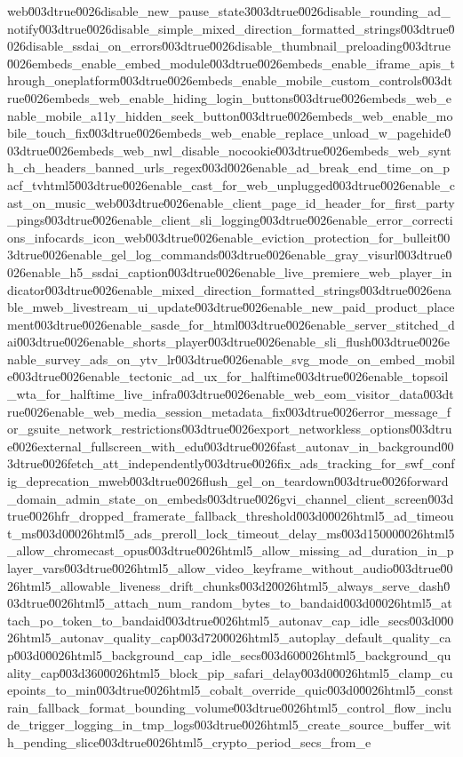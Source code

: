 {web\u003dtrue\u0026disable_new_pause_state3\u003dtrue\u0026disable_rounding_ad_notify\u003dtrue\u0026disable_simple_mixed_direction_formatted_strings\u003dtrue\u0026disable_ssdai_on_errors\u003dtrue\u0026disable_thumbnail_preloading\u003dtrue\u0026embeds_enable_embed_module\u003dtrue\u0026embeds_enable_iframe_apis_through_oneplatform\u003dtrue\u0026embeds_enable_mobile_custom_controls\u003dtrue\u0026embeds_web_enable_hiding_login_buttons\u003dtrue\u0026embeds_web_enable_mobile_a11y_hidden_seek_button\u003dtrue\u0026embeds_web_enable_mobile_touch_fix\u003dtrue\u0026embeds_web_enable_replace_unload_w_pagehide\u003dtrue\u0026embeds_web_nwl_disable_nocookie\u003dtrue\u0026embeds_web_synth_ch_headers_banned_urls_regex\u003d\u0026enable_ad_break_end_time_on_pacf_tvhtml5\u003dtrue\u0026enable_cast_for_web_unplugged\u003dtrue\u0026enable_cast_on_music_web\u003dtrue\u0026enable_client_page_id_header_for_first_party_pings\u003dtrue\u0026enable_client_sli_logging\u003dtrue\u0026enable_error_corrections_infocards_icon_web\u003dtrue\u0026enable_eviction_protection_for_bulleit\u003dtrue\u0026enable_gel_log_commands\u003dtrue\u0026enable_gray_visurl\u003dtrue\u0026enable_h5_ssdai_caption\u003dtrue\u0026enable_live_premiere_web_player_indicator\u003dtrue\u0026enable_mixed_direction_formatted_strings\u003dtrue\u0026enable_mweb_livestream_ui_update\u003dtrue\u0026enable_new_paid_product_placement\u003dtrue\u0026enable_sasde_for_html\u003dtrue\u0026enable_server_stitched_dai\u003dtrue\u0026enable_shorts_player\u003dtrue\u0026enable_sli_flush\u003dtrue\u0026enable_survey_ads_on_ytv_lr\u003dtrue\u0026enable_svg_mode_on_embed_mobile\u003dtrue\u0026enable_tectonic_ad_ux_for_halftime\u003dtrue\u0026enable_topsoil_wta_for_halftime_live_infra\u003dtrue\u0026enable_web_eom_visitor_data\u003dtrue\u0026enable_web_media_session_metadata_fix\u003dtrue\u0026error_message_for_gsuite_network_restrictions\u003dtrue\u0026export_networkless_options\u003dtrue\u0026external_fullscreen_with_edu\u003dtrue\u0026fast_autonav_in_background\u003dtrue\u0026fetch_att_independently\u003dtrue\u0026fix_ads_tracking_for_swf_config_deprecation_mweb\u003dtrue\u0026flush_gel_on_teardown\u003dtrue\u0026forward_domain_admin_state_on_embeds\u003dtrue\u0026gvi_channel_client_screen\u003dtrue\u0026hfr_dropped_framerate_fallback_threshold\u003d0\u0026html5_ad_timeout_ms\u003d0\u0026html5_ads_preroll_lock_timeout_delay_ms\u003d15000\u0026html5_allow_chromecast_opus\u003dtrue\u0026html5_allow_missing_ad_duration_in_player_vars\u003dtrue\u0026html5_allow_video_keyframe_without_audio\u003dtrue\u0026html5_allowable_liveness_drift_chunks\u003d2\u0026html5_always_serve_dash\u003dtrue\u0026html5_attach_num_random_bytes_to_bandaid\u003d0\u0026html5_attach_po_token_to_bandaid\u003dtrue\u0026html5_autonav_cap_idle_secs\u003d0\u0026html5_autonav_quality_cap\u003d720\u0026html5_autoplay_default_quality_cap\u003d0\u0026html5_background_cap_idle_secs\u003d60\u0026html5_background_quality_cap\u003d360\u0026html5_block_pip_safari_delay\u003d0\u0026html5_clamp_cuepoints_to_min\u003dtrue\u0026html5_cobalt_override_quic\u003d0\u0026html5_constrain_fallback_format_bounding_volume\u003dtrue\u0026html5_control_flow_include_trigger_logging_in_tmp_logs\u003dtrue\u0026html5_create_source_buffer_with_pending_slice\u003dtrue\u0026html5_crypto_period_secs_from_e}
